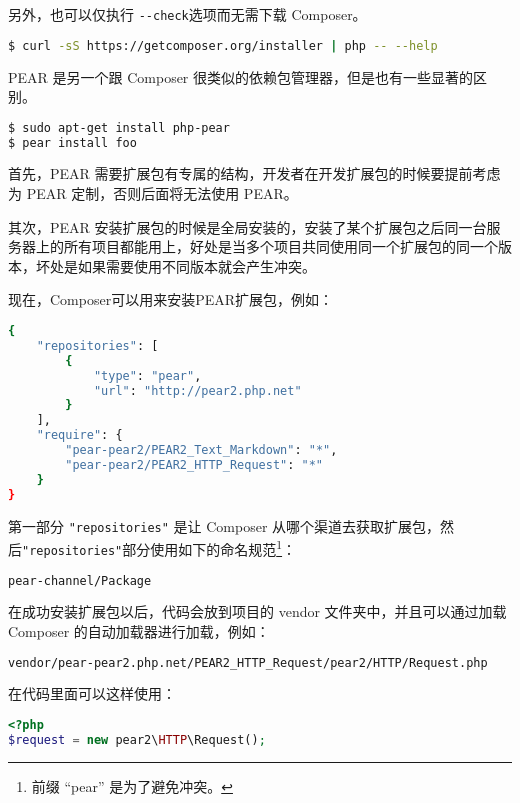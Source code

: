 另外，也可以仅执行 \texttt{-\/-check}选项而无需下载 Composer。 

\begin{lstlisting}[language=bash]
$ curl -sS https://getcomposer.org/installer | php -- --help
\end{lstlisting}

PEAR 是另一个跟 Composer 很类似的依赖包管理器，但是也有一些显著的区别。

\begin{lstlisting}[language=bash]
$ sudo apt-get install php-pear
$ pear install foo
\end{lstlisting}

首先，PEAR 需要扩展包有专属的结构，开发者在开发扩展包的时候要提前考虑为 PEAR 定制，否则后面将无法使用 PEAR。

其次，PEAR 安装扩展包的时候是全局安装的，安装了某个扩展包之后同一台服务器上的所有项目都能用上，好处是当多个项目共同使用同一个扩展包的同一个版本，坏处是如果需要使用不同版本就会产生冲突。

现在，Composer可以用来安装PEAR扩展包，例如：


\begin{lstlisting}[language=bash]
{
    "repositories": [
        {
            "type": "pear",
            "url": "http://pear2.php.net"
        }
    ],
    "require": {
        "pear-pear2/PEAR2_Text_Markdown": "*",
        "pear-pear2/PEAR2_HTTP_Request": "*"
    }
}
\end{lstlisting}

第一部分 \texttt{"repositories"} 是让 Composer 从哪个渠道去获取扩展包，然后\texttt{"repositories"}部分使用如下的命名规范\footnote{前缀 “pear” 是为了避免冲突。}：


\begin{lstlisting}[language=bash]
pear-channel/Package
\end{lstlisting}

在成功安装扩展包以后，代码会放到项目的 vendor 文件夹中，并且可以通过加载 Composer 的自动加载器进行加载，例如：

\begin{lstlisting}[language=bash]
vendor/pear-pear2.php.net/PEAR2_HTTP_Request/pear2/HTTP/Request.php
\end{lstlisting}

在代码里面可以这样使用：

\begin{lstlisting}[language=PHP]
<?php
$request = new pear2\HTTP\Request();
\end{lstlisting}


